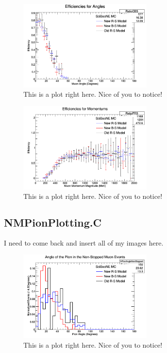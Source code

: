 \documentclass[11pt]{article}
\begin{document}
\begin{figure}[H]
\centering
\includegraphics[width=0.6\textwidth]{NMCombinedPlotsImages/24-NMCombinedPlots.png}
\caption{This is a plot right here. Nice of you to notice!}
\end{figure}

\begin{figure}[H]
\centering
\includegraphics[width=0.6\textwidth]{NMCombinedPlotsImages/25-NMCombinedPlots.png}
\caption{This is a plot right here. Nice of you to notice!}
\end{figure}

\subsection{NMPionPlotting.C}
I need to come back and insert all of my images here.

\begin{figure}[H]
\centering
\includegraphics[width=0.6\textwidth]{NMPionPlottingImages/1-NMPionPlotting.png}
\caption{This is a plot right here. Nice of you to notice!}
\end{figure}
\end{document}
